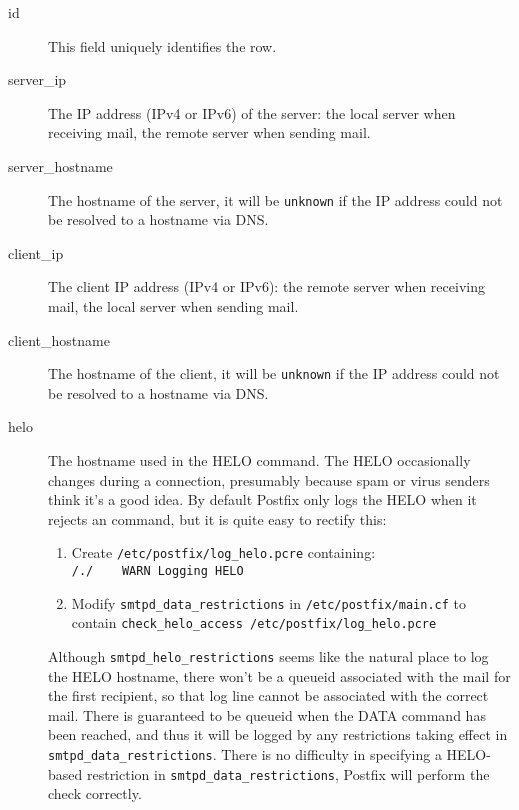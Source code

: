 \documentclass[a4paper,12pt,draft]{article}
\begin{document}
\begin{description}

    \item [id] This field uniquely identifies the row.

    \item [server\_ip] The IP address (IPv4 or IPv6) of the server: the
        local server when receiving mail, the remote server when sending
        mail.

    \item [server\_hostname] The hostname of the server, it will be
        \texttt{unknown} if the IP address could not be resolved to a
        hostname via DNS\@.

    \item [client\_ip] The client IP address (IPv4 or IPv6): the remote
        server when receiving mail, the local server when sending mail.

    \item [client\_hostname] The hostname of the client, it will be
        \texttt{unknown} if the IP address could not be resolved to a
        hostname via DNS\@.

    \item [helo] The hostname used in the HELO command.  The HELO
        occasionally changes during a connection, presumably because spam
        or virus senders think it's a good idea.  By default Postfix only
        logs the HELO when it rejects an \SMTP{} command, but it is quite
        easy to rectify this: 

\label{logging helo}

        \begin{enumerate}

            \item Create \texttt{/etc/postfix/log\_helo.pcre}
                containing:\newline
                \hspace*{2em}\texttt{/./~~~~WARN~Logging~HELO}

            \item Modify \texttt{smtpd\_data\_restrictions} in
                \texttt{/etc/postfix/main.cf} to contain\newline
                \hspace*{2em}\texttt{check\_helo\_access~/etc/postfix/log\_helo.pcre}

        \end{enumerate}

        Although \texttt{smtpd\_helo\_restrictions} seems like the natural
        place to log the HELO hostname, there won't be a queueid associated
        with the mail for the first recipient, so that log line cannot be
        associated with the correct mail.  There is guaranteed to be
        queueid when the DATA command has been reached, and thus it will be
        logged by any restrictions taking effect in
        \texttt{smtpd\_data\_restrictions}.  There is no difficulty in
        specifying a HELO-based restriction in
        \texttt{smtpd\_data\_restrictions}, Postfix will perform the check
        correctly.


\end{description}
\end{document}
